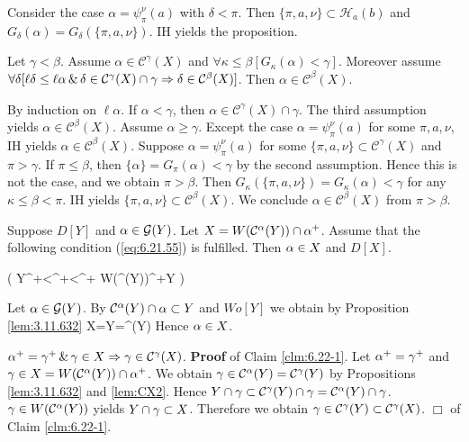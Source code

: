 \documentclass{article}
\begin{document}
Consider the case $\alpha=\psi_{\pi}^{\nu}(a)$ with $\delta<\pi$.
Then $\{\pi,a,\nu\}\subset\mathcal{H}_{a}(b)$ and 
$G_{\delta}(\alpha)= G_{\delta}(\{\pi,a,\nu\})$.
IH yields the proposition.
\eprf

\begin{proposition}\label{lem:CX3} 
Let $\gamma<\beta$.
Assume $\alpha\in\mathcal{C}^{\gamma}(X)$ and $\forall\kappa\leq\beta[G_{\kappa}(\alpha)<\gamma]$.
Moreover assume 
$\forall\delta[\ell\delta\leq\ell\alpha\,\&\,\delta\in\mathcal{C}^{\gamma}(X)\cap\gamma
\Rightarrow \delta\in \mathcal{C}^{\beta}(X)]$.
Then $\alpha\in\mathcal{C}^{\beta}(X)$.
\end{proposition}
\bprf
By induction on $\ell\alpha$. 
If $\alpha<\gamma$, then $\alpha\in \mathcal{C}^{\gamma}(X)\cap\gamma$.
The third assumption yields $\alpha\in \mathcal{C}^{\beta}(X)$. 
Assume $\alpha\geq\gamma$. 
Except the case $\alpha=\psi_{\pi}^{\nu}(a)$ for some $\pi,a,\nu$, 
IH yields $\alpha\in\mathcal{C}^{\beta}(X)$. 
Suppose $\alpha=\psi_{\pi}^{\nu}(a)$ for some $\{\pi,a,\nu\}\subset\mathcal{C}^{\gamma}(X)$ and 
$\pi>\gamma$.
If $\pi\leq\beta$, then $\{\alpha\}=G_{\pi}(\alpha)<\gamma$ by the second assumption. 
Hence this is not the case, and we obtain 
$\pi>\beta$.
 Then $G_{\kappa}(\{\pi,a,\nu\})=G_{\kappa}(\alpha)<\gamma$ for any $\kappa\leq\beta<\pi$. 
IH yields $\{\pi,a,\nu\}\subset\mathcal{C}^{\beta}(X)$. 
We conclude $\alpha\in\mathcal{C}^{\beta}(X)$ from $\pi>\beta$.
\eprf






\blem\label{lem:6.21}
Suppose $D[Y]$ and $\alpha\in\mathcal{G}(Y)$.
Let 
$X=W(\mathcal{C}^{\alpha}(Y))\cap\alpha^{+}$.
Assume that the following condition (\ref{eq:6.21.55})
is fulfilled.
Then $\alpha\in X$ and $D[X]$.

\beqn
\fal\bet\left(
Y\cap\alp^{+}<\bet \spand \bet^{+}<\alp^{+} \to
W(^{\bet}(Y))\cap\bet^{+}\subset Y
\right)
\label{eq:6.21.55}
\eeqn

\elem
\bprf
Let $\alpha\in\mathcal{G}(Y)$.
By $\mathcal{C}^{\alpha}(Y)\cap\alpha\subset Y$ and $Wo[Y]$
we obtain by Proposition \ref{lem:3.11.632}
\beqn\label{eq:6.21.57}
X\cap\alp=Y\cap\alp=^{\alp}(Y)\cap\alp
\eeqn
Hence $\alpha\in X$.

\bclm\label{clm:6.22-1}
$\alpha^{+}=\gamma^{+} \,\&\, \gamma\in X \Rightarrow \gamma\in\mathcal{C}^{\gamma}(X)$.
\eclm
\textbf{Proof} of Claim \ref{clm:6.22-1}.
Let $\alpha^{+}=\gamma^{+}$ and
$\gamma\in X=W(\mathcal{C}^{\alpha}(Y))\cap\alpha^{+}$. 
We obtain $\gamma\in \mathcal{C}^{\alpha}(Y)=\mathcal{C}^{\gamma}(Y)$ by 
Propositions \ref{lem:3.11.632} and \ref{lem:CX2}.
Hence
 $Y\cap\gamma\subset \mathcal{C}^{\gamma}(Y)\cap\gamma=\mathcal{C}^{\alpha}(Y)\cap\gamma$.
$\gamma\in W(\mathcal{C}^{\alpha}(Y))$ yields
$Y\cap\gamma\subset X$.
Therefore
we obtain
$\gamma\in\mathcal{C}^{\gamma}(Y)\subset\mathcal{C}^{\gamma}(X)$.
\hspace*{\fill} $\Box$ of Claim \ref{clm:6.22-1}.
\end{document}
